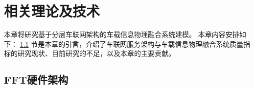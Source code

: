 \chapter[\hspace{0pt}相关理论及技术]{{\hspace{-5pt}相关理论及技术}}
\removelofgap
\removelotgap
本章将研究基于分层车联网架构的车载信息物理融合系统建模。
本章内容安排如下：
\ref{section 2-1} 节是本章的引言，介绍了车联网服务架构与车载信息物理融合系统质量指标的研究现状、目前研究的不足，以及本章的主要贡献。

\section[\hspace{-2pt}FFT硬件架构]
{{ \hspace{-8pt}FFT硬件架构}}\label{section 2-1}


